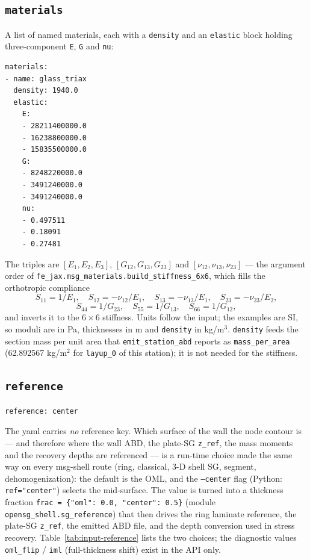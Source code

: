 \subsection{\texttt{materials}}

A list of named materials, each with a \texttt{density} and an \texttt{elastic}
block holding three-component \texttt{E}, \texttt{G} and \texttt{nu}:

\begin{lstlisting}[style=shellst,caption={One material block from iea\_s10\_shell.yaml.}]
materials:
- name: glass_triax
  density: 1940.0
  elastic:
    E:
    - 28211400000.0
    - 16238800000.0
    - 15835500000.0
    G:
    - 8248220000.0
    - 3491240000.0
    - 3491240000.0
    nu:
    - 0.497511
    - 0.18091
    - 0.27481
\end{lstlisting}

The triples are $[E_1, E_2, E_3]$, $[G_{12}, G_{13}, G_{23}]$ and $[\nu_{12},
\nu_{13}, \nu_{23}]$ --- the argument order of
\texttt{fe\_jax.msg\_materials.build\_stiffness\_6x6}, which fills the
orthotropic compliance
\[
S_{11} = 1/E_1,\quad S_{12} = -\nu_{12}/E_1,\quad S_{13} = -\nu_{13}/E_1,\quad
S_{23} = -\nu_{23}/E_2,
\]
\[
S_{44} = 1/G_{23},\quad S_{55} = 1/G_{13},\quad S_{66} = 1/G_{12},
\]
and inverts it to the $6\times6$ stiffness. Units follow the input; the examples
are SI, so moduli are in Pa, thicknesses in m and \texttt{density} in
kg/m$^3$. \texttt{density} feeds the section mass per unit area that
\texttt{emit\_station\_abd} reports as \texttt{mass\_per\_area} (62.892567
kg/m$^2$ for \texttt{layup\_0} of this station); it is not needed for the
stiffness.

\subsection{\texttt{reference}}

\begin{lstlisting}[style=shellst,caption={The whole reference block -- one scalar, the last line of the file.}]
reference: center
\end{lstlisting}

The yaml carries \emph{no} reference key. Which surface of the wall the node
contour is --- and therefore where the wall ABD, the plate-SG \texttt{z\_ref},
the mass moments and the recovery depths are referenced --- is a run-time
choice made the same way on every msg-shell route (ring, classical, 3-D shell
SG, segment, dehomogenization): the default is the OML, and the
\texttt{--center} flag (Python: \texttt{ref="center"}) selects the mid-surface.
The value is turned into a thickness fraction
\texttt{frac = \{"oml": 0.0, "center": 0.5\}} (module
\texttt{opensg\_shell.sg\_reference}) that then drives the ring laminate
reference, the plate-SG \texttt{z\_ref}, the emitted ABD file, and the depth
conversion used in stress recovery. Table~\ref{tab:input-reference} lists the
two choices; the diagnostic values \texttt{oml\_flip} / \texttt{iml}
(full-thickness shift) exist in the API only.

